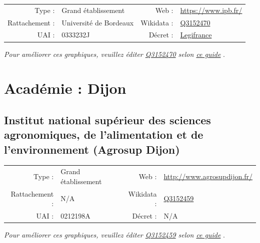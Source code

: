 \documentclass[12pt,french,landscape]{article}
\begin{document}
\begin{tabular*}{0.45\textwidth}{rp{2cm}rl}  
\hline  
Type : & Grand établissement & Web : &\href{https://www.ipb.fr/}{https://www.ipb.fr/} \\  
Rattachement : & Université de Bordeaux & Wikidata : & \href{https://www.wikidata.org/entity/Q3152470}{Q3152470} \\  
UAI : & 0333232J & Décret : & \href{http://legifrance.gouv.fr/affichTexte.do?cidTexte=JORFTEXT000030820446&dateTexte=&categorieLien=id}{Legifrance} \\  
\hline  
\end{tabular*}

\textit{\scriptsize Pour améliorer ces graphiques, veuillez éditer \href{https://www.wikidata.org/entity/Q3152470}{Q3152470}  selon \href{https://github.com/cpesr/wikidataESR/blob/master/Rmd/wikidataESR.md}{ce guide}}
.


\newpage

\hypertarget{acaduxe9mie-dijon-1}{%
\section{Académie : Dijon}\label{acaduxe9mie-dijon-1}}

\hypertarget{institut-national-supuxe9rieur-des-sciences-agronomiques-de-lalimentation-et-de-lenvironnement-agrosup-dijon}{%
\subsection{Institut national supérieur des sciences agronomiques, de
l'alimentation et de l'environnement (Agrosup
Dijon)}\label{institut-national-supuxe9rieur-des-sciences-agronomiques-de-lalimentation-et-de-lenvironnement-agrosup-dijon}}

\begin{tabular*}{0.45\textwidth}{rp{2cm}rl}  
\hline  
Type : & Grand établissement & Web : &\href{http://www.agrosupdijon.fr/}{http://www.agrosupdijon.fr/} \\  
Rattachement : & N/A & Wikidata : & \href{https://www.wikidata.org/entity/Q3152459}{Q3152459} \\  
UAI : & 0212198A & Décret : & N/A \\  
\hline  
\end{tabular*}

\textit{\scriptsize Pour améliorer ces graphiques, veuillez éditer \href{https://www.wikidata.org/entity/Q3152459}{Q3152459}  selon \href{https://github.com/cpesr/wikidataESR/blob/master/Rmd/wikidataESR.md}{ce guide}}
.
\end{document}
